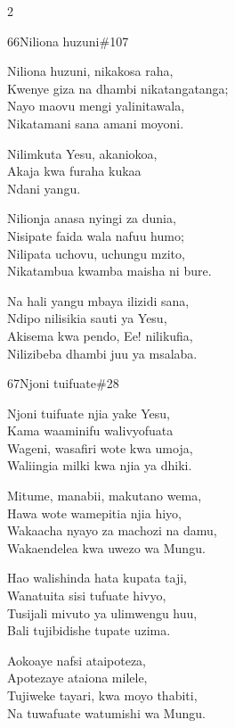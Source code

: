 \begin{multicols}{2}
\begin{hymn}{66}{Niliona huzuni}{\#107}
\begin{stanza}
Niliona huzuni, nikakosa raha,\\
Kwenye giza na dhambi nikatangatanga;\\
Nayo maovu mengi yalinitawala,\\
Nikatamani sana amani moyoni.
\end{stanza}
\begin{chorus}
Nilimkuta Yesu, akaniokoa,\\
Akaja kwa furaha kukaa\\
Ndani yangu.
\end{chorus}
\begin{stanza}
Nilionja anasa nyingi za dunia,\\
Nisipate faida wala nafuu humo;\\
Nilipata uchovu, uchungu mzito,\\
Nikatambua kwamba maisha ni bure.
\end{stanza}
\begin{stanza}
Na hali yangu mbaya ilizidi sana,\\
Ndipo nilisikia sauti ya Yesu,\\
Akisema kwa pendo, Ee! nilikufia,\\
Nilizibeba dhambi juu ya msalaba.
\end{stanza}
\end{hymn}

\begin{hymn}{67}{Njoni tuifuate}{\#28}
\begin{stanza}
Njoni tuifuate njia yake Yesu,\\
Kama waaminifu walivyofuata\\
Wageni, wasafiri wote kwa umoja,\\
Waliingia milki kwa njia ya dhiki.
\end{stanza}
\begin{stanza}
Mitume, manabii, makutano wema,\\
Hawa wote wamepitia njia hiyo,\\
Wakaacha nyayo za machozi na damu,\\
Wakaendelea kwa uwezo wa Mungu.
\end{stanza}
\begin{stanza}
Hao walishinda hata kupata taji,\\
Wanatuita sisi tufuate hivyo,\\
Tusijali mivuto ya ulimwengu huu,\\
Bali tujibidishe tupate uzima.
\end{stanza}
\begin{stanza}
Aokoaye nafsi ataipoteza,\\
Apotezaye ataiona milele,\\
Tujiweke tayari, kwa moyo thabiti,\\
Na tuwafuate watumishi wa Mungu.
\end{stanza}
\end{hymn}


\end{multicols}
